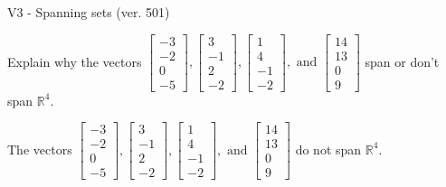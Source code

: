 \begin{exercise}
  \begin{exerciseTitle}V3 - Spanning sets (ver. 501)\end{exerciseTitle}
  \begin{exerciseStatement}
    Explain why the vectors \(\left[\begin{array}{r}
-3 \\
-2 \\
0 \\
-5
\end{array}\right] , \left[\begin{array}{r}
3 \\
-1 \\
2 \\
-2
\end{array}\right] , \left[\begin{array}{r}
1 \\
4 \\
-1 \\
-2
\end{array}\right] , \text{ and } \left[\begin{array}{r}
14 \\
13 \\
0 \\
9
\end{array}\right]\) span or don't span \(\mathbb{R}^4\). 
	


  \end{exerciseStatement}
  \begin{exerciseAnswer}
   The vectors \(\left[\begin{array}{r}
-3 \\
-2 \\
0 \\
-5
\end{array}\right] , \left[\begin{array}{r}
3 \\
-1 \\
2 \\
-2
\end{array}\right] , \left[\begin{array}{r}
1 \\
4 \\
-1 \\
-2
\end{array}\right] , \text{ and } \left[\begin{array}{r}
14 \\
13 \\
0 \\
9
\end{array}\right]\) 
  	 do not  
	span \(\mathbb{R}^4\).
  


  \end{exerciseAnswer}
\end{exercise}